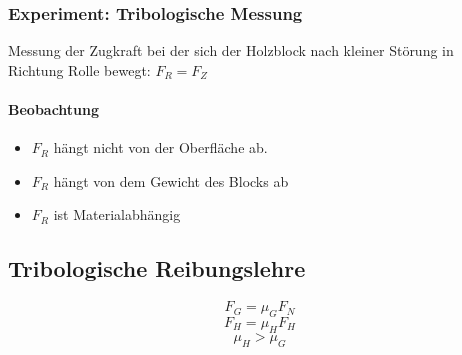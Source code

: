 \documentclass[a4paper]{scrartcl}
\theoremstyle{definition}
\theoremstyle{plain}
\theoremstyle{plain}
\theoremstyle{remark}
\theoremstyle{remark}
\theoremstyle{remark}
\begin{document}

\subsubsection{Experiment: Tribologische Messung}
\label{sec-3-7-2}
Messung der Zugkraft bei der sich der Holzblock nach kleiner Störung in Richtung Rolle bewegt: $F_R = F_Z$
\paragraph{Beobachtung}
\label{sec-3-7-2-1}
\begin{itemize}
\item $F_R$ hängt nicht von der Oberfläche ab.
\item $F_R$ hängt von dem Gewicht des Blocks ab
\item $F_R$ ist Materialabhängig
\end{itemize}

\subsection{Tribologische Reibungslehre}
\label{sec-3-8}
\[F_G = \mu_G F_N \tag{$\mu_G=$ Gleitreibungskraft}\]
\[F_H = \mu_H F_H \tag{$\mu_H=$ Haftreibungskraft}\]
\[\mu_H > \mu_G\]
\end{document}
